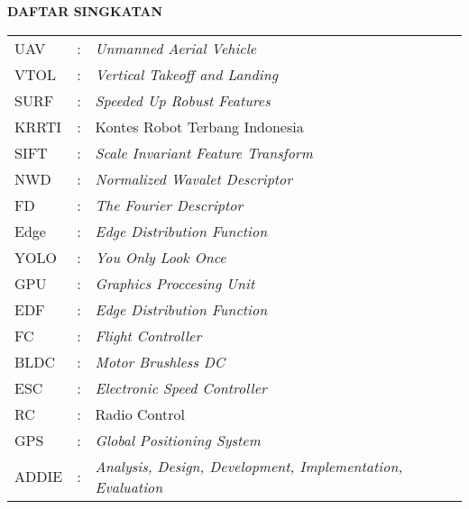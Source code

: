 \clearpage
{}
{}

\begin{center}
    \large \textbf{DAFTAR SINGKATAN}
\end{center}
\vspace{3em}

\begin{center}
    \begin{table}[htbp]
        \begin{tabular}{l l l}
            UAV            &:& \textit{Unmanned Aerial Vehicle}  \\ %
            VTOL             &:& \textit{Vertical Takeoff and Landing} \\ %
            SURF             &:& \textit{Speeded Up Robust Features}    \\ %
            KRRTI             &:&  Kontes Robot Terbang Indonesia  \\ %
            SIFT              &:& \textit{Scale Invariant Feature Transform}             \\ %
            NWD              &:& \textit {Normalized Wavalet Descriptor} \\ %
            FD              &:& \textit{The Fourier Descriptor}             \\ %
            Edge              &:& \textit{Edge Distribution Function}            \\ %
            YOLO              &:& \textit{You Only Look Once}             \\ %
            GPU              &:& \textit{Graphics Proccesing Unit}            \\ %
            EDF             &:& \textit{Edge Distribution Function}        \\ %
            FC              &:& \textit{Flight Controller}             \\ %
           BLDC              &:& \textit{Motor Brushless DC}            \\ %
            ESC              &:& \textit{Electronic Speed Controller}            \\
             RC              &:& {Radio Control} \\ %
            GPS              &:& \textit{Global Positioning System}             \\ %
            ADDIE              &:& \textit{Analysis, Design, Development, Implementation, Evaluation}   \\ %
           
        \end{tabular}
    \end{table}
\end{center}


